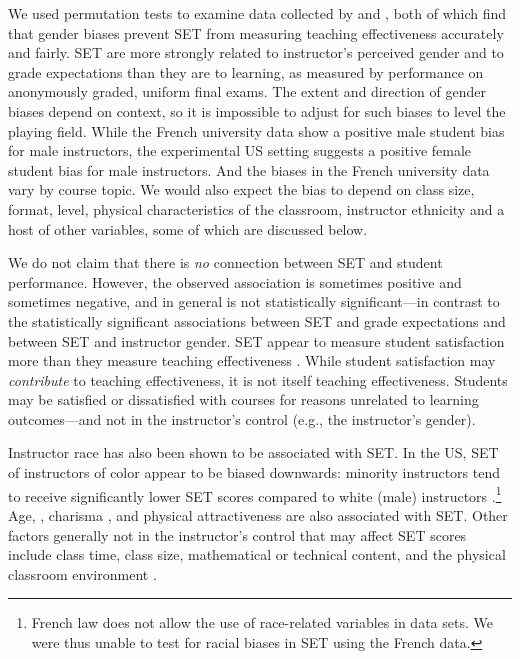 \documentclass[12pt]{article}
\begin{document}
We used permutation tests to examine data collected  by
\citet{Boring2015} and \citet{MacNell2014}, both of which find that gender biases prevent 
SET from measuring teaching effectiveness accurately and fairly. 
SET are more strongly related to instructor's perceived gender and to grade expectations 
than they are to learning, 
as measured by performance on anonymously graded, uniform final exams. 
The extent and direction of gender biases depend on context, so it is
impossible to adjust for such biases to level the playing field.
While the French university data show a positive male student bias for male instructors, 
the experimental US setting suggests a positive female student bias for male instructors.
And the biases in the French university data vary by course topic.
We would also expect the bias to depend on class size, format, level, physical characteristics
of the classroom, instructor ethnicity and a host of other variables, some of which
are discussed below.

We do not claim that there is \emph{no} connection between SET and student
performance.
However, the observed association is sometimes positive and sometimes
negative, and in general is not statistically significant---in contrast to
the statistically significant associations between SET and grade expectations and 
between SET and instructor gender.
SET appear to measure student satisfaction more than they measure teaching 
effectiveness \citep{StarkFreishtat2014}. 
While student satisfaction may \emph{contribute} to teaching effectiveness, it is not 
itself teaching effectiveness.
Students may be satisfied or dissatisfied with courses for reasons unrelated to 
learning outcomes---and not in the instructor's control (e.g., the instructor's gender).

Instructor race has also been shown to be associated with SET.
In the US, SET of instructors of color appear to be biased downwards:
minority instructors tend to receive significantly lower SET scores compared to white (male) 
instructors \citep{Merritt2008}.\footnote{%
  French law does not allow the use of race-related variables in data sets. 
  We were thus unable to test for racial biases in SET using the French data.
} 
Age, \citep{Arbuckle2003}, 
charisma \citep{Shevlin2000}, and 
physical attractiveness \citep{Riniolo2006,Hamermesh2005} 
are also associated with SET.
Other factors generally not in the instructor's control that may affect SET scores include
class time, class size, mathematical or technical content, and the 
physical classroom environment \citep{Hill2010}.
\end{document}
